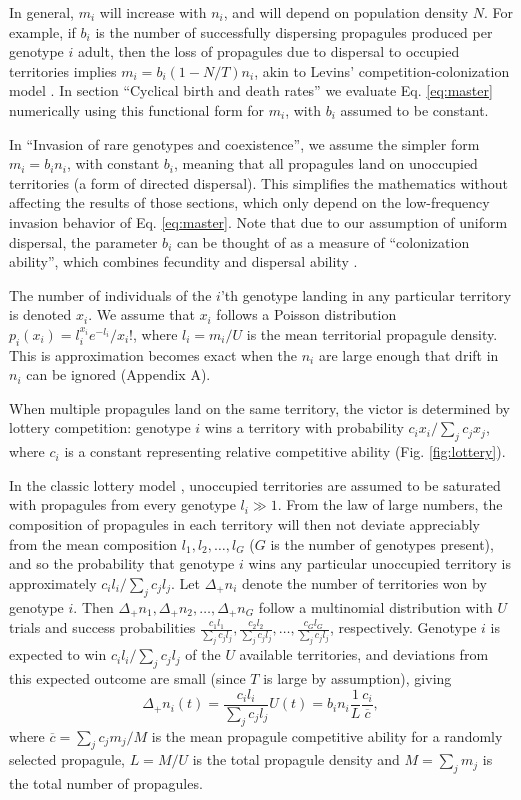 \documentclass[11pt]{article}
\begin{document}
In general, $m_i$ will increase with $n_i$, and will depend on population density $N$. For example, if $b_i$ is the number of successfully dispersing propagules produced per genotype $i$ adult, then the loss of propagules due to dispersal to occupied territories implies $m_i=b_i(1-N/T)n_i$, akin to Levins' competition-colonization model \citep{levins_71,tilman_94}. In section ``Cyclical birth and death rates'' we evaluate Eq. \eqref{eq:master} numerically using this functional form for $m_i$, with $b_i$ assumed to be constant. 

In ``Invasion of rare genotypes and coexistence'', we assume the simpler form $m_i=b_i n_i$, with constant $b_i$, meaning that all propagules land on unoccupied territories (a form of directed dispersal). This simplifies the mathematics without affecting the results of those sections, which only depend on the low-frequency invasion behavior of Eq. \eqref{eq:master}. Note that due to our assumption of uniform dispersal, the parameter $b_i$ can be thought of as a measure of ``colonization ability'', which combines fecundity and dispersal ability \citep{levins_71,tilman_94,bolker_99}. 

The number of individuals of the $i$'th genotype landing in any particular territory is denoted $x_i$. We assume that $x_i$ follows a Poisson distribution $p_i(x_i)=l_i^{x_i} e^{-l_i}/x_i!$, where $l_i=m_i/U$ is the mean territorial propagule density. This is approximation becomes exact when the $n_i$ are large enough that drift in $n_i$ can be ignored (Appendix A).

When multiple propagules land on the same territory, the victor is determined by lottery competition: genotype $i$ wins a territory with probability $c_i x_i/\sum_j c_j x_j$, where $c_i$ is a constant representing relative competitive ability (Fig. \ref{fig:lottery}). 

In the classic lottery model \citep{chesson_1981}, unoccupied territories are assumed to be saturated with propagules from every genotype $l_i\gg 1$. From the law of large numbers, the composition of propagules in each territory will then not deviate appreciably from the mean composition $l_1,l_2,\ldots,l_G$ ($G$ is the number of genotypes present), and so the probability that genotype $i$ wins any particular unoccupied territory is approximately $c_i l_i/\sum_j c_j l_j$. Let $\Delta_+ n_i$ denote the number of territories won by genotype $i$. Then $\Delta_+ n_1,\Delta_+ n_2,\ldots,\Delta_+ n_G$ follow a multinomial distribution with $U$ trials and success probabilities $\frac{c_1 l_1}{\sum_j c_j l_j},\frac{c_2 l_2}{\sum_j c_j l_j},\ldots,\frac{c_G l_G}{\sum_j c_j l_j}$, respectively. Genotype $i$ is expected to win $c_i l_i/\sum_j c_j l_j$ of the $U$ available territories, and deviations from this expected outcome are small (since $T$ is large by assumption), giving 
\begin{equation}
\Delta_+ n_i(t)=\frac{c_i l_i}{\sum_j c_j l_j}U(t)=b_i n_i\frac{1}{L}\frac{c_i}{\overline{c}}, \label{eq:lottery}
\end{equation}
where $\overline{c}=\sum_j c_j m_j/M$ is the mean propagule competitive ability for a randomly selected propagule, $L=M/U$ is the total propagule density and $M=\sum_j m_j$ is the total number of propagules. 
\end{document}
